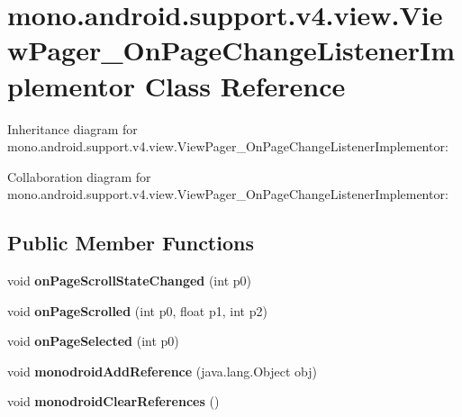 \hypertarget{classmono_1_1android_1_1support_1_1v4_1_1view_1_1_view_pager___on_page_change_listener_implementor}{}\section{mono.\+android.\+support.\+v4.\+view.\+View\+Pager\+\_\+\+On\+Page\+Change\+Listener\+Implementor Class Reference}
\label{classmono_1_1android_1_1support_1_1v4_1_1view_1_1_view_pager___on_page_change_listener_implementor}


Inheritance diagram for mono.\+android.\+support.\+v4.\+view.\+View\+Pager\+\_\+\+On\+Page\+Change\+Listener\+Implementor\+:


Collaboration diagram for mono.\+android.\+support.\+v4.\+view.\+View\+Pager\+\_\+\+On\+Page\+Change\+Listener\+Implementor\+:
\subsection*{Public Member Functions}
\begin{DoxyCompactItemize}
\item 
\mbox{\label{classmono_1_1android_1_1support_1_1v4_1_1view_1_1_view_pager___on_page_change_listener_implementor_a02e554ea766868bfd76878d838994d5f}} 
void {\bfseries on\+Page\+Scroll\+State\+Changed} (int p0)
\item 
\mbox{\label{classmono_1_1android_1_1support_1_1v4_1_1view_1_1_view_pager___on_page_change_listener_implementor_a0c677384a013e2df856b45b6d83e0db6}} 
void {\bfseries on\+Page\+Scrolled} (int p0, float p1, int p2)
\item 
\mbox{\label{classmono_1_1android_1_1support_1_1v4_1_1view_1_1_view_pager___on_page_change_listener_implementor_acaacca2c239f05cf90bf740e2a6707ec}} 
void {\bfseries on\+Page\+Selected} (int p0)
\item 
\mbox{\label{classmono_1_1android_1_1support_1_1v4_1_1view_1_1_view_pager___on_page_change_listener_implementor_a1764e9eb5a260e6463f4257d572f0dbf}} 
void {\bfseries monodroid\+Add\+Reference} (java.\+lang.\+Object obj)
\item 
\mbox{\label{classmono_1_1android_1_1support_1_1v4_1_1view_1_1_view_pager___on_page_change_listener_implementor_ad6e42f49a1f05cca8f7bdd484b17a552}} 
void {\bfseries monodroid\+Clear\+References} ()
\end{DoxyCompactItemize}
